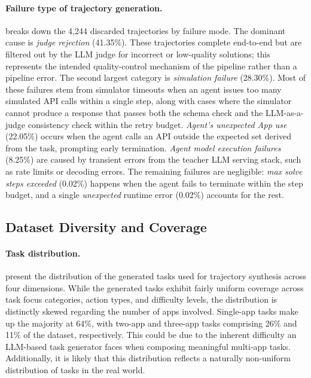 \paragraph{Failure type of trajectory generation.}
 breaks down the 4,244 discarded trajectories by failure mode. The dominant cause is \emph{judge rejection} (41.35\%). These trajectories complete end-to-end but are filtered out by the LLM judge for incorrect or low-quality solutions; this represents the intended quality-control mechanism of the pipeline rather than a pipeline error. The second largest category is \emph{simulation failure} (28.30\%). Most of these failures stem from simulator timeouts when an agent issues too many simulated API calls within a single step, along with cases where the simulator cannot produce a response that passes both the schema check and the LLM-as-a-judge consistency check within the retry budget. \emph{Agent's unexpected App use} (22.05\%) occurs when the agent calls an API outside the expected set derived from the task, prompting early termination. \emph{Agent model execution failures} (8.25\%) are caused by transient errors from the teacher LLM serving stack, such as rate limits or decoding errors. The remaining failures are negligible: \emph{max solve steps exceeded} (0.02\%) happens when the agent fails to terminate within the step budget, and a single \emph{unexpected} runtime error (0.02\%) accounts for the rest.

\subsection{Dataset Diversity and Coverage}


\paragraph{Task distribution.}
 present the distribution of the generated tasks used for trajectory synthesis across four dimensions. While the generated tasks exhibit fairly uniform coverage across task focus categories, action types, and difficulty levels, the distribution is distinctly skewed regarding the number of apps involved. Single-app tasks make up the majority at 64\%, with two-app and three-app tasks comprising 26\% and 11\% of the dataset, respectively. This could be due to the inherent difficulty an LLM-based task generator faces when composing meaningful multi-app tasks. Additionally, it is likely that this distribution reflects a naturally non-uniform distribution of tasks in the real world.

